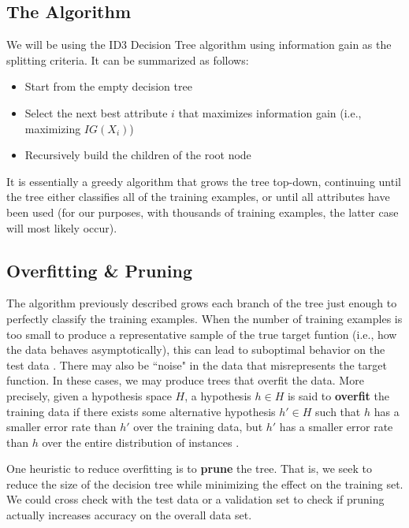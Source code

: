 \documentclass{article}
\begin{document}
\subsection{The Algorithm}

We will be using the ID3 Decision Tree algorithm using information gain as the splitting criteria. It can be summarized as follows:

\begin{itemize}
\item Start from the empty decision tree
\item Select the next best attribute $i$ that maximizes information gain (i.e., maximizing $IG(X_i)$)
\item Recursively build the children of the root node
\end{itemize}

It is essentially a greedy algorithm that grows the tree top-down, continuing until the tree either classifies all of the training examples, or until all attributes have been used (for our purposes, with thousands of training examples, the latter case will most likely occur).\\

\subsection{Overfitting \& Pruning}

The algorithm previously described grows each branch of the tree just enough to perfectly classify the training examples. When the number of training examples is too small to produce a representative sample of the true target funtion (i.e., how the data behaves asymptotically), this can lead to suboptimal behavior on the test data \cite{mitchell1997}. There may also be ``noise" in the data that misrepresents the target function. In these cases, we may produce trees that overfit the data. More precisely, given a hypothesis space $H$, a hypothesis $h \in H$ is said to \textbf{overfit} the training data if there exists some alternative hypothesis $h' \in H$ such that $h$ has a smaller error rate than $h'$ over the training data, but $h'$ has a smaller error rate than $h$ over the entire distribution of instances \cite{mitchell1997}. 

One heuristic to reduce overfitting is to \textbf{prune} the tree. That is, we seek to reduce the size of the decision tree while minimizing the effect on the training set. We could cross check with the test data or a validation set to check if pruning actually increases accuracy on the overall data set.
\end{document}
